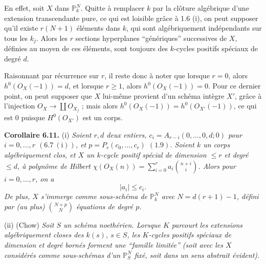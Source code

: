 
En effet, soit $X$ dans $\mathbb P^N_k$. Quitte \`a remplacer $k$ par la cl\^oture alg\'ebrique d'une extension transcendante pure, ce qui est loisible gr\^ace \`a 1.6 (i), on peut supposer qu'il existe $r(N+1)$ \'el\'ements dans $k$, qui sont alg\'ebriquement ind\'ependants sur tous les $k_j$. Alors les $r$ sections hyperplanes ``g\'en\'eriques'' successives de $X$, d\'efinies au moyen de ces \'el\'ements, sont toujours des $k$-cycles positifs sp\'eciaux de degr\'e $d$.

Raisonnant par r\'ecurrence sur $r$, il reste donc \`a noter que lorsque $r=0$, alors $h^0({O}_X(-1))=d$, et lorsque $r\ge1$, alors $h^0({O}_X(-1))=0$. Pour ce dernier point, on peut supposer que $X$ lui-m\^eme provient d'un sch\'ema int\`egre $X'$, gr\^ace \`a l'injection ${O}_X\to \coprod{O}_{X_j}$ ; mais alors $h^0({O}_X(-1))=h^0({O}_{X'}(-1))$, ce qui est $0$ puisque $H^0({O}_{X'})$ est un corps.

\textbf{Corollaire 6.11.} (i) \emph{Soient $r,d$ deux entiers, $c_i=A_{r-i}(0,\ldots,0,d;0)$ pour $i=0,\ldots,r$ $(6.7\ \mathrm{(i)})$, et $p=P_r(c_0,\ldots,c_r)$ $(1.9)$. Soient $k$ un corps alg\'ebriquement clos, et $X$ un $k$-cycle positif sp\'ecial de dimension $\le r$ et degr\'e $\le d$, \`a polyn\^ome de Hilbert $\chi({O}_X(n))=\sum_{i=0}^{r}a_i\binom{n+i}{i}$. Alors pour $i=0,\ldots,r$, on a}
\[
   |a_i|\le c_i.
\]
\emph{De plus, $X$ s'immerge comme sous-sch\'ema de $\mathbb P^N_k$ avec $N=d(r+1)-1$, d\'efini par (au plus) $\binom{N+p}{N}$ \'equations de degr\'e $p$.}

(ii) (Chow) \emph{Soit $S$ un sch\'ema noeth\'erien. Lorsque $K$ parcourt les extensions alg\'ebriquement closes des $k(s)$, $s\in S$, les $K$-cycles positifs sp\'eciaux de dimension et degr\'e born\'es forment une ``famille limit\'ee'' (soit avec les $X$ consid\'er\'es comme sous-sch\'emas d'un $\mathbb P^N_S$ fix\'e, soit dans un sens abstrait \'evident).}

